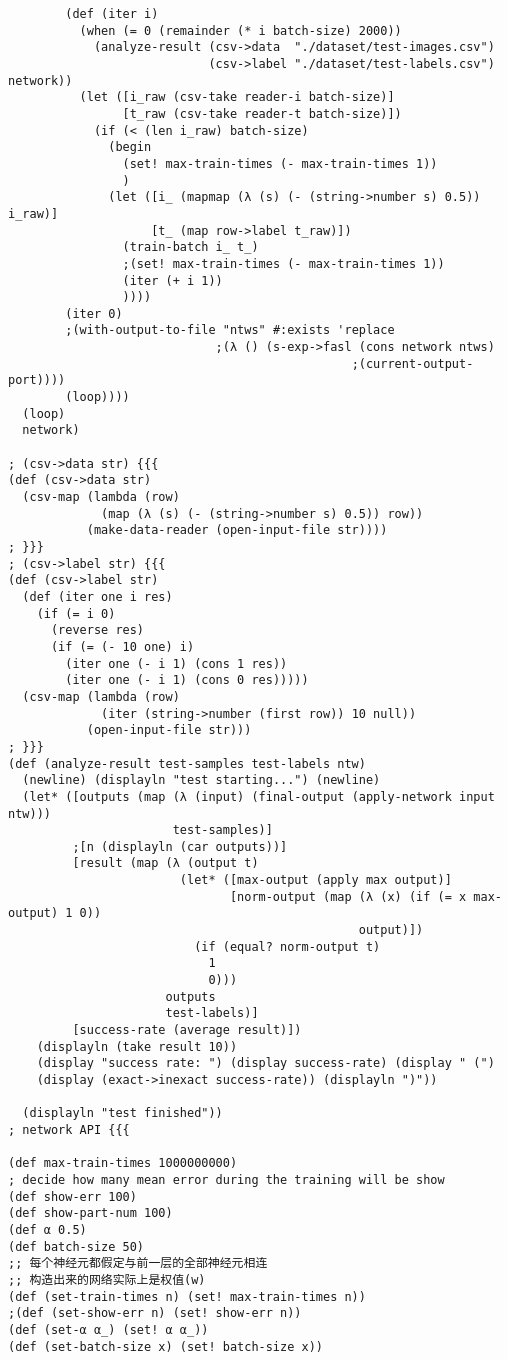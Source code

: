 \documentclass{article}
\begin{document}
\begin{lstlisting}
        (def (iter i)
          (when (= 0 (remainder (* i batch-size) 2000))
            (analyze-result (csv->data  "./dataset/test-images.csv")
                            (csv->label "./dataset/test-labels.csv") network))
          (let ([i_raw (csv-take reader-i batch-size)]
                [t_raw (csv-take reader-t batch-size)])
            (if (< (len i_raw) batch-size)
              (begin
                (set! max-train-times (- max-train-times 1))
                )
              (let ([i_ (mapmap (λ (s) (- (string->number s) 0.5)) i_raw)]
                    [t_ (map row->label t_raw)])
                (train-batch i_ t_)
                ;(set! max-train-times (- max-train-times 1))
                (iter (+ i 1))
                ))))
        (iter 0)
        ;(with-output-to-file "ntws" #:exists 'replace
                             ;(λ () (s-exp->fasl (cons network ntws)
                                                ;(current-output-port))))
        (loop))))
  (loop)
  network)

; (csv->data str) {{{
(def (csv->data str)
  (csv-map (lambda (row)
             (map (λ (s) (- (string->number s) 0.5)) row))
           (make-data-reader (open-input-file str))))
; }}}
; (csv->label str) {{{
(def (csv->label str)
  (def (iter one i res)
    (if (= i 0)
      (reverse res)
      (if (= (- 10 one) i)
        (iter one (- i 1) (cons 1 res))
        (iter one (- i 1) (cons 0 res)))))
  (csv-map (lambda (row)
             (iter (string->number (first row)) 10 null))
           (open-input-file str)))
; }}}
(def (analyze-result test-samples test-labels ntw)
  (newline) (displayln "test starting...") (newline)
  (let* ([outputs (map (λ (input) (final-output (apply-network input ntw)))
                       test-samples)]
         ;[n (displayln (car outputs))]
         [result (map (λ (output t)
                        (let* ([max-output (apply max output)]
                               [norm-output (map (λ (x) (if (= x max-output) 1 0))
                                                 output)])
                          (if (equal? norm-output t)
                            1
                            0)))
                      outputs
                      test-labels)]
         [success-rate (average result)])
    (displayln (take result 10))
    (display "success rate: ") (display success-rate) (display " (")
    (display (exact->inexact success-rate)) (displayln ")"))

  (displayln "test finished"))
; network API {{{

(def max-train-times 1000000000)
; decide how many mean error during the training will be show
(def show-err 100) 
(def show-part-num 100)
(def α 0.5)
(def batch-size 50)
;; 每个神经元都假定与前一层的全部神经元相连
;; 构造出来的网络实际上是权值(w)
(def (set-train-times n) (set! max-train-times n))
;(def (set-show-err n) (set! show-err n))
(def (set-α α_) (set! α α_))
(def (set-batch-size x) (set! batch-size x))


\end{lstlisting}
\end{document}
